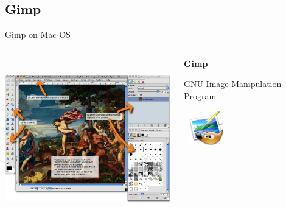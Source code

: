 \documentclass[11pt,hyperref={pdfpagemode=FullScreen}]{beamer}
\begin{document}
\subsection{Gimp}
\begin{frame}{Gimp on Mac OS}
\begin{columns}
\begin{column}{0.7\textwidth}
 \includegraphics[width=7.5cm, height=7cm]{gimp}
\end{column}
\begin{column}{0.3\textwidth}
 \begin{center}\textbf{Gimp}\end{center}
\begin{center}GNU Image Manipulation Program\end{center}
\begin{center}
 \href {http://www.gimp.org}{}
\end{center}
\begin{center}

  \includegraphics[width=2cm, height=1.5cm]{logogimp.jpg}
\end{center}
\end{column}

\end{columns}
\end{frame}
\end{document}
